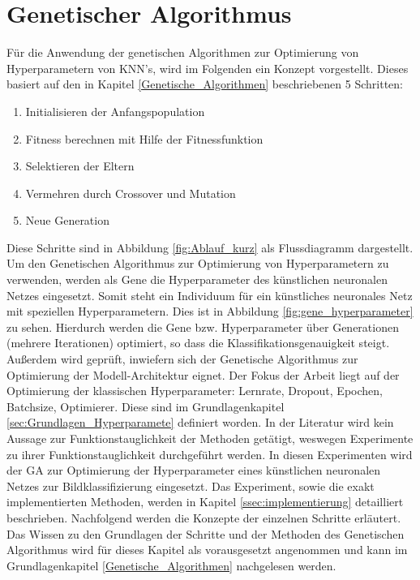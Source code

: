 \section{Genetischer Algorithmus} \label{ssec:GA}
Für die Anwendung der genetischen Algorithmen zur Optimierung von Hyperparametern von KNN's, wird im Folgenden ein Konzept vorgestellt. Dieses basiert auf den in Kapitel \ref{Genetische_Algorithmen} beschriebenen 5 Schritten:\\
\begin{enumerate}
  \item Initialisieren der Anfangspopulation
  \item Fitness berechnen mit Hilfe der Fitnessfunktion
  \item Selektieren der Eltern
  \item Vermehren durch Crossover und Mutation
  \item Neue Generation
\end{enumerate}
Diese Schritte sind in Abbildung \ref{fig:Ablauf_kurz} als Flussdiagramm dargestellt. Um den Genetischen Algorithmus zur Optimierung von Hyperparametern zu verwenden, werden als Gene die Hyperparameter des künstlichen neuronalen Netzes eingesetzt. Somit steht ein Individuum für ein künstliches neuronales Netz mit speziellen Hyperparametern. Dies ist in Abbildung \ref{fig:gene_hyperparameter} zu sehen. Hierdurch  werden die Gene bzw. Hyperparameter über Generationen (mehrere Iterationen) optimiert, so dass die Klassifikationsgenauigkeit steigt. Außerdem wird geprüft, inwiefern sich der Genetische Algorithmus zur Optimierung der Modell-Architektur eignet. Der Fokus der Arbeit liegt auf der Optimierung der klassischen Hyperparameter: Lernrate, Dropout, Epochen, Batchsize, Optimierer. Diese sind im Grundlagenkapitel \ref{sec:Grundlagen_Hyperparamete} definiert worden. In der Literatur wird kein Aussage zur Funktionstauglichkeit der Methoden getätigt, weswegen Experimente zu ihrer Funktionstauglichkeit durchgeführt werden. In diesen Experimenten wird der GA zur Optimierung der Hyperparameter eines künstlichen neuronalen Netzes zur Bildklassifizierung eingesetzt. Das Experiment, sowie die exakt implementierten Methoden, werden in Kapitel \ref{ssec:implementierung} detailliert beschrieben. Nachfolgend werden die Konzepte der einzelnen Schritte erläutert. Das Wissen zu den Grundlagen der Schritte und der Methoden des Genetischen Algorithmus wird für dieses Kapitel als vorausgesetzt angenommen und kann im Grundlagenkapitel \ref{Genetische_Algorithmen} nachgelesen werden.

